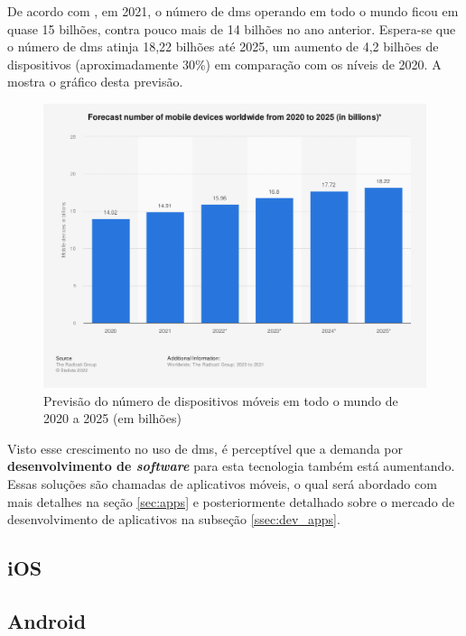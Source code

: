 De acordo com \citet{laricchia_2022}, em 2021, o número de \acp{dm} operando em todo o mundo ficou em quase 15 bilhões, contra pouco mais de 14 bilhões no ano anterior. Espera-se que o número de \acp{dm} atinja 18,22 bilhões até 2025, um aumento de 4,2 bilhões de dispositivos (aproximadamente 30\%) em comparação com os níveis de 2020. A  mostra o gráfico desta previsão.

\begin{figure}[h]
\centering
  \includegraphics[width=\columnwidth]{images/mobiles20to25.png}
  \caption{Previsão do número de dispositivos móveis em todo o mundo de 2020 a 2025 (em bilhões)}
  \label{fig:mobiles20to25}
\end{figure}

Visto esse crescimento no uso de \acp{dm}, é perceptível que a demanda por \textbf{desenvolvimento de \textit{software}} para esta tecnologia também está aumentando. Essas soluções são chamadas de aplicativos móveis, o qual será abordado com mais detalhes na seção \ref{sec:apps} e posteriormente detalhado sobre o mercado de desenvolvimento de aplicativos na subseção \ref{ssec:dev_apps}.

\subsection{iOS}\label{ssec:ios}
\lipsum[1]


\subsection{Android}\label{ssec:android}
\lipsum[1]


